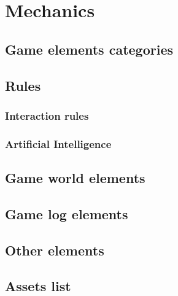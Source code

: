 \section{Mechanics}

\subsection{Game elements categories}

\subsection{Rules}

\subsubsection{Interaction rules}

\subsubsection{Artificial Intelligence}

\subsection{Game world elements}

\subsection{Game log elements}

\subsection{Other elements}

\subsection{Assets list}
